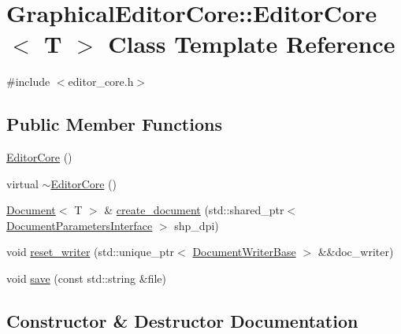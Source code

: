 \hypertarget{classGraphicalEditorCore_1_1EditorCore}{}\section{Graphical\+Editor\+Core\+:\+:Editor\+Core$<$ T $>$ Class Template Reference}
\label{classGraphicalEditorCore_1_1EditorCore}


{\ttfamily \#include $<$editor\+\_\+core.\+h$>$}

\subsection*{Public Member Functions}
\begin{DoxyCompactItemize}
\item 
\hyperlink{classGraphicalEditorCore_1_1EditorCore_ae6b7d39c0e657e2364d0e78bb2ada3ea}{Editor\+Core} ()
\item 
virtual \hyperlink{classGraphicalEditorCore_1_1EditorCore_ac16fa9bd735820ff6fbf3066dd271e81}{$\sim$\+Editor\+Core} ()
\item 
\hyperlink{classGraphicalEditorCore_1_1Document}{Document}$<$ T $>$ \& \hyperlink{classGraphicalEditorCore_1_1EditorCore_a4387885d89e2cf6e3cfdc255255c3047}{create\+\_\+document} (std\+::shared\+\_\+ptr$<$ \hyperlink{classGraphicalEditorCore_1_1DocumentParametersInterface}{Document\+Parameters\+Interface} $>$ shp\+\_\+dpi)
\item 
void \hyperlink{classGraphicalEditorCore_1_1EditorCore_adb7b174b5c93890dfbfc955a36a2ee4f}{reset\+\_\+writer} (std\+::unique\+\_\+ptr$<$ \hyperlink{classGraphicalEditorCore_1_1DocumentWriterBase}{Document\+Writer\+Base} $>$ \&\&doc\+\_\+writer)
\item 
void \hyperlink{classGraphicalEditorCore_1_1EditorCore_ad04cc698d57b190d4f78f50210c88a36}{save} (const std\+::string \&file)
\end{DoxyCompactItemize}


\subsection{Constructor \& Destructor Documentation}
